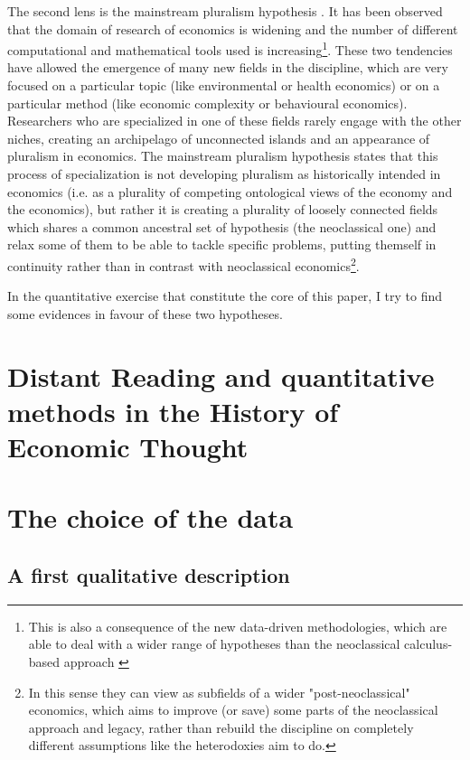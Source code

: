 \documentclass[a4paper, headings=standardclasses]{scrartcl}
\begin{document}
The second lens is the mainstream pluralism hypothesis \parencite{davis2006,davis2019a,davis2019b,cedrini2018}. It has been observed that the domain of research of economics is widening and the number of different computational and mathematical tools used is increasing\footnote{This is also a consequence of the new data-driven methodologies, which are able to deal with a wider range of hypotheses than the neoclassical calculus-based approach \Parencite[see][]{cherrier2022}}. These two tendencies have allowed the emergence of many new fields in the discipline, which are very focused on a particular topic (like environmental or health economics) or on a particular method (like economic complexity or behavioural economics).
Researchers who are specialized in one of these fields rarely engage with the other niches, creating an archipelago of unconnected islands and an appearance of pluralism in economics.
The mainstream pluralism hypothesis states that this process of specialization is not developing pluralism as historically intended in economics (i.e. as a plurality of competing ontological views of the economy and the economics), but rather it is creating a plurality of loosely connected fields which shares a common ancestral set of hypothesis (the neoclassical one) and relax some of them to be able to tackle specific problems, putting themself in continuity rather than in contrast with neoclassical economics\footnote{In this sense they can view as subfields of a wider "post-neoclassical" economics, which aims to improve (or save) some parts of the neoclassical approach and legacy, rather than rebuild the discipline on completely different assumptions like the heterodoxies aim to do.}.

In the quantitative exercise that constitute the core of this paper, I try to find some evidences in favour of these two hypotheses.

\section{Distant Reading and quantitative methods in the History of Economic Thought}

\section{The choice of the data}

\subsection{A first qualitative description}
\end{document}
